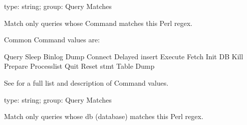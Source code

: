 \documentclass[letterpaper,10pt,english]{sphinxmanual}
\begin{document}
\begin{fulllineitems}
\label{\detokenize{mariadb-kill:cmdoption-mariadb-kill-match-command}}
type: string; group: Query Matches

Match only queries whose Command matches this Perl regex.

Common Command values are:

\begin{sphinxVerbatim}[commandchars=\\\{\}]
Query
Sleep
Binlog Dump
Connect
Delayed insert
Execute
Fetch
Init DB
Kill
Prepare
Processlist
Quit
Reset stmt
Table Dump
\end{sphinxVerbatim}

See  for a full
list and description of Command values.

\end{fulllineitems}


\begin{fulllineitems}
\label{\detokenize{mariadb-kill:cmdoption-mariadb-kill-match-db}}
type: string; group: Query Matches

Match only queries whose db (database) matches this Perl regex.

\end{fulllineitems}

\end{document}
